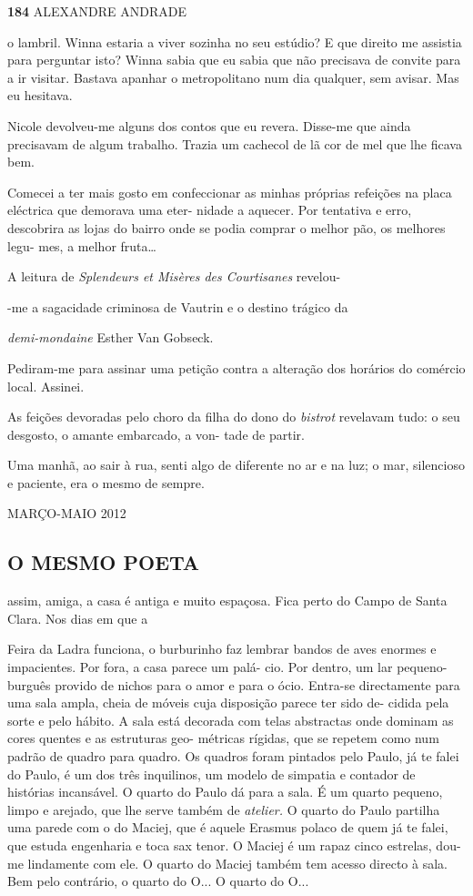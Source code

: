 \textbf{184 }ALEXANDRE ANDRADE

o lambril. Winna estaria a viver sozinha no seu estúdio? E que direito
me assistia para perguntar isto? Winna sabia que eu sabia que não
precisava de convite para a ir visitar. Bastava apanhar o metropolitano
num dia qualquer, sem avisar. Mas eu hesitava.

Nicole devolveu-me alguns dos contos que eu revera. Disse-me que ainda
precisavam de algum trabalho. Trazia um cachecol de lã cor de mel que
lhe ficava bem.

Comecei a ter mais gosto em confeccionar as minhas próprias refeições na
placa eléctrica que demorava uma eter- nidade a aquecer. Por tentativa e
erro, descobrira as lojas do bairro onde se podia comprar o melhor pão,
os melhores legu- mes, a melhor fruta\ldots{}

A leitura de \emph{Splendeurs et Misères des Courtisanes }revelou-

-me a sagacidade criminosa de Vautrin e o destino trágico da

\emph{demi-mondaine }Esther Van Gobseck.

Pediram-me para assinar uma petição contra a alteração dos horários do
comércio local. Assinei.

As feições devoradas pelo choro da filha do dono do \emph{bistrot
}revelavam tudo: o seu desgosto, o amante embarcado, a von- tade de
partir.

Uma manhã, ao sair à rua, senti algo de diferente no ar e na luz; o mar,
silencioso e paciente, era o mesmo de sempre.

MARÇO-MAIO 2012

\subsection{O MESMO POETA}

assim, amiga, a casa é antiga e muito espaçosa. Fica perto do Campo de
Santa Clara. Nos dias em que a

Feira da Ladra funciona, o burburinho faz lembrar bandos de aves enormes
e impacientes. Por fora, a casa parece um palá- cio. Por dentro, um lar
pequeno-burguês provido de nichos para o amor e para o ócio. Entra-se
directamente para uma sala ampla, cheia de móveis cuja disposição parece
ter sido de- cidida pela sorte e pelo hábito. A sala está decorada com
telas abstractas onde dominam as cores quentes e as estruturas geo-
métricas rígidas, que se repetem como num padrão de quadro para quadro.
Os quadros foram pintados pelo Paulo, já te falei do Paulo, é um dos
três inquilinos, um modelo de simpatia e contador de histórias
incansável. O quarto do Paulo dá para a sala. É um quarto pequeno, limpo
e arejado, que lhe serve também de \emph{atelier. }O quarto do Paulo
partilha uma parede com o do Maciej, que é aquele Erasmus polaco de quem
já te falei, que estuda engenharia e toca sax tenor. O Maciej é um rapaz
cinco estrelas, dou-me lindamente com ele. O quarto do Maciej também tem
acesso directo à sala. Bem pelo contrário, o quarto do O... O quarto do
O...

